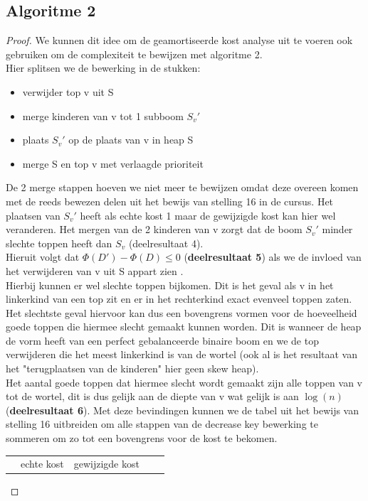 \documentclass[10pt,a4paper,twoside]{article}
\begin{document}
\subsection{Algoritme 2}
\begin{proof}
We kunnen dit idee om de geamortiseerde kost analyse uit te voeren ook gebruiken om de complexiteit te bewijzen met algoritme 2.\\
Hier splitsen we de bewerking in de stukken:
\begin{itemize}
    \item verwijder top v uit S
    \item merge kinderen van v tot 1 subboom $S_v'$
    \item plaats $S_v'$ op de plaats van v in heap S
    \item merge S en top v met verlaagde prioriteit
\end{itemize}
De 2 merge stappen hoeven we niet meer te bewijzen omdat deze overeen komen met de reeds bewezen delen uit het bewijs van stelling 16 in de cursus. Het plaatsen van $S_v'$ heeft als echte kost 1 maar de gewijzigde kost kan hier wel veranderen. Het mergen van de 2 kinderen van v zorgt dat de boom $S_v'$ minder slechte toppen heeft dan $S_v$ (deelresultaat 4).\\
Hieruit volgt dat $\Phi(D')-\Phi(D)\leq0$ (\textbf{deelresultaat 5}) als we de invloed van het verwijderen van v uit S appart zien .\\
Hierbij kunnen er wel slechte toppen bijkomen. Dit is het geval als v in het linkerkind van een top zit en er in het rechterkind exact evenveel toppen zaten. Het slechtste geval hiervoor kan dus een bovengrens vormen voor de hoeveelheid goede toppen die hiermee slecht gemaakt kunnen worden. Dit is wanneer de heap de vorm heeft van een perfect gebalanceerde binaire boom en we de top verwijderen die het meest linkerkind is van de wortel (ook al is het resultaat van het "terugplaatsen van de kinderen" hier geen skew heap).
\\
Het aantal goede toppen dat hiermee slecht wordt gemaakt zijn alle toppen van v tot de wortel, dit is dus gelijk aan de diepte van v wat gelijk is aan $\log(n)$ (\textbf{deelresultaat 6}). Met deze bevindingen kunnen we de tabel uit het bewijs van stelling 16 uitbreiden om alle stappen van de decrease key bewerking te sommeren om zo tot een bovengrens voor de kost te bekomen.
\begin{table}[H]
\begin{tabular}{lllll}
\cline{1-3}
\multicolumn{1}{|l|}{}                                   & \multicolumn{1}{l|}{echte kost} & \multicolumn{1}{l|}{gewijzigde kost}                  &  &  \\ \cline{1-3}

\end{tabular}
\end{table}
\end{proof}
\end{document}
